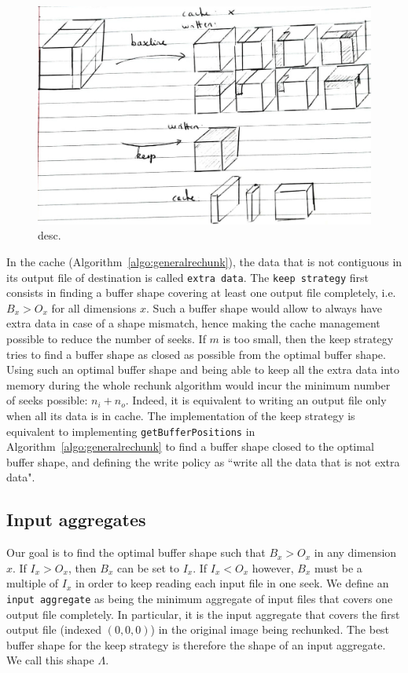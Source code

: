 \documentclass[conference]{IEEEtran}
\begin{document}
\begin{figure}[h]
\centering
\includegraphics[scale=0.25]{./figures/new/naive_vs_keep.jpeg}
\caption{desc.}
\label{fig:keepvsbaseline}
\end{figure}

In the cache (Algorithm~\ref{algo:generalrechunk}), the data that is not
contiguous in its output file of destination is called \texttt{extra data}.
The \texttt{keep strategy} first consists in finding a buffer shape covering at least
one output file completely, i.e. $B_x>O_x$ for all dimensions $x$.
Such a buffer shape would allow to always have extra data in case of a shape
mismatch, hence making the cache management possible to reduce the number of seeks.
If $m$ is too small, then the keep strategy tries to find a buffer
shape as closed as possible from the optimal buffer shape. Using such an optimal
buffer shape and being able to keep all the extra data into memory during the
whole rechunk algorithm would incur the minimum number of seeks possible: $n_i + n_o$.
Indeed, it is equivalent to writing an output file only when all its data is in
cache.
The implementation of the keep strategy is equivalent to implementing
\texttt{getBufferPositions} in Algorithm~\ref{algo:generalrechunk} to find a
buffer shape closed to the optimal buffer shape, and defining the write policy
as ``write all the data that is not extra data".

\subsection{Input aggregates}
Our goal is to find the optimal buffer shape such that $B_x>O_x$ in any dimension $x$.
If $I_x > O_x$, then $B_x$ can be set to $I_x$. If $I_x < O_x$ however, $B_x$
must be a multiple of $I_x$ in order to keep reading each input file in one seek.
We define an \texttt{input aggregate} as being the minimum aggregate of input files that
covers one output file completely. In particular, it is the input aggregate that
covers the first output file (indexed $(0,0,0)$) in the original image being
rechunked. The best buffer shape for the keep strategy is therefore the shape of
an input aggregate. We call this shape $\Lambda$.
\end{document}
